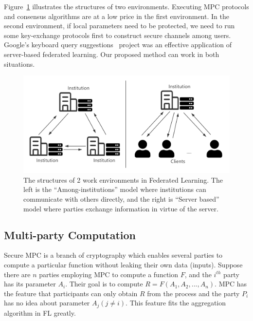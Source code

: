 Figure~\ref{fl_model} illustrates the structures of two environments. Executing MPC protocols and consensus algorithms are at a low price in the first environment. In the second environment, if local parameters need to be protected, we need to run some key-exchange protocols first to construct secure channels among users. Google's keyboard query suggestions~\cite{yang2018applied} project was an effective application of server-based federated learning. Our proposed method can work in both situations.

\begin{figure}[!ht]
    \centering
    \includegraphics[width=\columnwidth]{img/fl_model.png}
    \caption{The structures of 2 work environments in Federated Learning. The left is the ``Among-institutions'' model where institutions can communicate with others directly, and the right is ``Server based'' model where parties exchange information in virtue of the server.}
    \label{fl_model}
\end{figure}


\subsection{Multi-party Computation}
Secure MPC is a branch of cryptography which enables several parties to compute a particular function without leaking their own data (inputs). Suppose there are $n$ parties employing MPC to compute a function $F$, and the $i^{th}$ party has its parameter $A_i$. Their goal is to compute $R = F(A_1, A_2, ..., A_n)$. MPC has the feature that participants can only obtain $R$ from the process and the party $P_i$ has no idea about parameter $A_j (j \ne i)$. This feature fits the aggregation algorithm in FL greatly.

